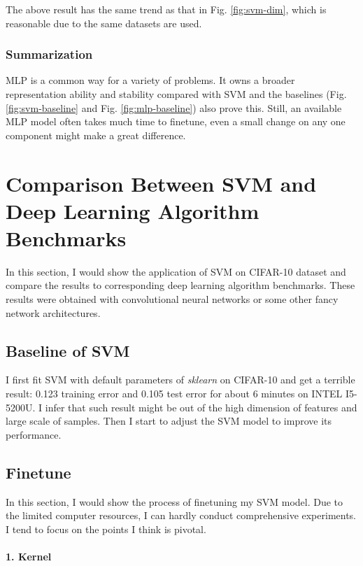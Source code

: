\documentclass[12pt,a4paper]{article}
\theoremstyle{definition}
\begin{document}
The above result has the same trend as that in Fig. \ref{fig:svm-dim}, which is reasonable due to the same datasets are used.

\subsubsection{Summarization}
\label{sec:sum-mlp}

MLP is a common way for a variety of problems. It owns a broader representation ability and stability compared with SVM and the baselines (Fig. \ref{fig:svm-baseline} and Fig. \ref{fig:mlp-baseline}) also prove this. Still, an available MLP model often takes much time to finetune, even a small change on any one component might make a great difference.

\section{Comparison Between SVM and Deep Learning Algorithm Benchmarks}

In this section, I would show the application of SVM on CIFAR-10 dataset \cite{cifar-10} and compare the results to corresponding deep learning algorithm benchmarks. These results were obtained with convolutional neural networks or some other fancy network architectures.

\subsection{Baseline of SVM}
\vspace{0.01\linewidth}

I first fit SVM with default parameters of \textit{sklearn} on CIFAR-10 and get a terrible result: 0.123 training error and 0.105 test error for about 6 minutes on INTEL I5-5200U. I infer that such result might be out of the high dimension of features and large scale of samples. Then I start to adjust the SVM model to improve its performance.

\subsection{Finetune}
\label{sec:finetune}

In this section, I would show the process of finetuning my SVM model. Due to the limited computer resources, I can hardly conduct comprehensive experiments. I tend to focus on the points I think is pivotal.

\paragraph{1. Kernel}
\end{document}
